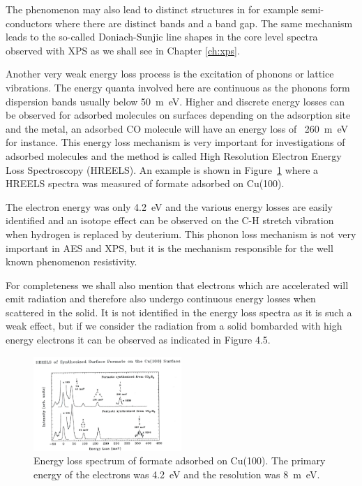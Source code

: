 The phenomenon may also lead to distinct structures in for example semi-conductors where there are distinct bands and a band gap. The same mechanism leads to the so-called Doniach-Sunjic line shapes in the core level spectra observed with XPS as we shall see in Chapter \ref{ch:xps}.

Another very weak energy loss process is the excitation of phonons or lattice vibrations. The energy quanta involved here are continuous as the phonons form dispersion bands usually below \SI{50}{m\electronvolt}. Higher and discrete energy losses can be observed for adsorbed molecules on surfaces depending on the adsorption site and the metal, an adsorbed CO molecule will have an energy loss of ~\SI{260}{m\electronvolt} for instance. This energy loss mechanism is very important for investigations of adsorbed molecules and the method is called High Resolution Electron Energy Loss Spectroscopy (HREELS). An example is shown in Figure~\ref{fig:formate_spectrum} where a HREELS spectra was measured of formate adsorbed on Cu(100).

The electron energy was only \SI{4.2}{\electronvolt} and the various energy losses are easily identified and an isotope effect can be observed on the C-H stretch vibration when hydrogen is replaced by deuterium. This phonon loss mechanism is not very important in AES and XPS, but it is the mechanism responsible for the well known phenomenon resistivity.

For completeness we shall also mention that electrons which are accelerated will emit radiation \cite{Feynman} and therefore also undergo continuous energy losses when scattered in the solid. It is not identified in the energy loss spectra as it is such a weak effect, but if we consider the radiation from a solid bombarded with high energy electrons it can be observed as indicated in Figure 4.5.

\begin{figure}[htbp]
\centering
\includegraphics[width=0.5\textwidth]{figures/02_13}
\caption{Energy loss spectrum of formate adsorbed on Cu(100). The primary energy of the electrons was \SI{4.2}{\electronvolt} and the resolution was \SI{8}{m\electronvolt}.}
\label{fig:formate_spectrum}
\end{figure}

